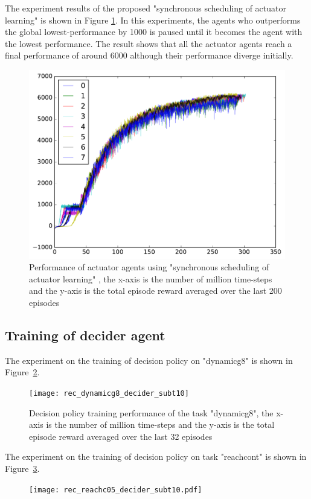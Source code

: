 The experiment results of the proposed "synchronous scheduling of actuator learning" is shown in Figure \ref{rec_sync_training}. In this experiments, the agents who outperforms the global lowest-performance by 1000 is paused until it becomes the agent with the lowest performance. The result shows that all the actuator agents reach a final performance of around 6000 although their performance diverge initially.

\begin{figure}[!htbp]
	\includegraphics[width=\textwidth]{images/rec_sync_training.pdf}
	\centering
	\caption{Performance of actuator agents using "synchronous scheduling of actuator learning" , the x-axis is the number of million time-steps and the y-axis is the total episode reward averaged over the last 200 episodes}\label{rec_sync_training}
\end{figure}

\subsection{Training of decider agent}
The experiment on the training of decision policy on "dynamicg8" is shown in Figure~\ref{fig:rec_dynamicg8_decider_subt10}. %

\begin{figure}[!htbp]
\centering
\texttt{[image: rec\_dynamicg8\_decider\_subt10]}
\caption{Decision policy training performance of the task "dynamicg8", the x-axis is the number of million time-steps and the y-axis is the total episode reward averaged over the last 32 episodes}
\label{fig:rec_dynamicg8_decider_subt10}
\end{figure}

The experiment on the training of decision policy on task "reachcont" is shown in Figure~\ref{fig:rec_reachc05_decider_subt10}.
\begin{figure}
\centering
\texttt{[image: rec\_reachc05\_decider\_subt10.pdf]}
\caption{}
\label{fig:rec_reachc05_decider_subt10}
\end{figure}


